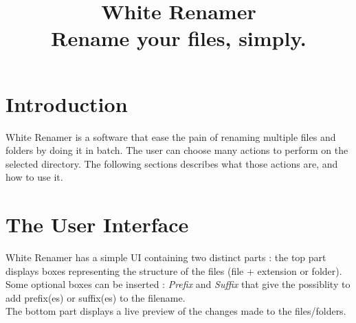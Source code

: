\documentclass[10pt, a4paper]{scrartcl}
\title{\color{white}\Huge\textsf{White Renamer}\\[1.5cm]
\large\textsf{Rename your files, simply.}}
\date{}
\author{}
\newcommand{\HRule}[1]{\rule{\linewidth}{#1}} 	%
\begin{document}
\setlength{\parindent}{0pt}
\restoregeometry %
\nopagecolor%
\renewcommand{\labelitemi}{$\bullet$}
\section{Introduction}
White Renamer is a software that ease the pain of renaming multiple files and folders by doing it in batch. The user can choose many actions to perform on the selected directory. The following sections describes what those actions are, and how to use it.

\section{The User Interface}
White Renamer has a simple UI containing two distinct parts : the top part displays boxes representing the structure of the files (file + extension or folder). \\
Some optional boxes can be inserted : \emph{Prefix} and \emph{Suffix} that give the possiblity to add prefix(es) or suffix(es) to the filename.\\
The bottom part displays a live preview of the changes made to the files/folders.
\end{document}
